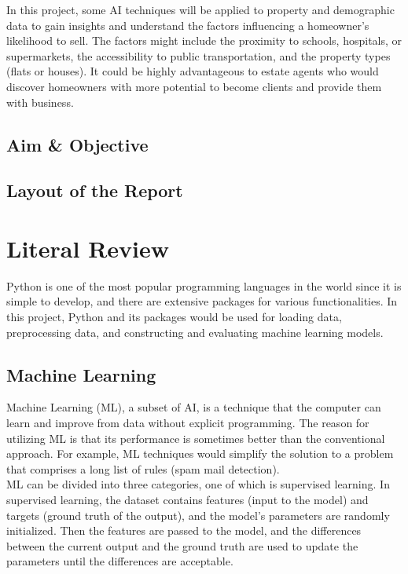 \documentclass[12pt,twoside]{report}
\begin{document}
In this project, some AI techniques will be applied to property and demographic data to gain insights and understand the factors influencing a homeowner's likelihood to sell. The factors might include the proximity to schools, hospitals, or supermarkets, the accessibility to public transportation, and the property types (flats or houses). It could be highly advantageous to estate agents who would discover homeowners with more potential to become clients and provide them with business. 

\section{Aim \& Objective}
\section{Layout of the Report}

\chapter{Literal Review}
Python is one of the most popular programming languages in the world since it is simple to develop, and there are extensive packages for various functionalities. In this project, Python and its packages would be used for loading data, preprocessing data, and constructing and evaluating machine learning models. 

\section{Machine Learning}
Machine Learning (ML), a subset of AI, is a technique that the computer can learn and improve from data without explicit programming. The reason for utilizing ML is that its performance is sometimes better than the conventional approach. For example, ML techniques would simplify the solution to a problem that comprises a long list of rules (spam mail detection). 
\\

ML can be divided into three categories, one of which is supervised learning. In supervised learning, the dataset contains features (input to the model) and targets (ground truth of the output), and the model's parameters are randomly initialized. Then the features are passed to the model, and the differences between the current output and the ground truth are used to update the parameters until the differences are acceptable. 
\\
\end{document}
